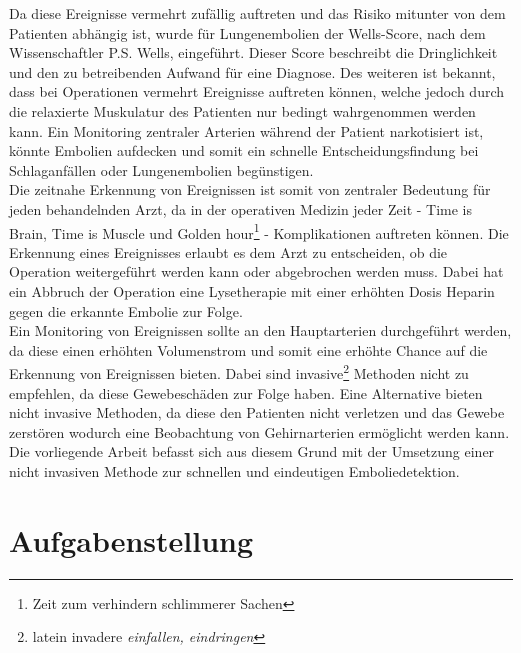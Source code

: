 Da diese Ereignisse vermehrt zufällig auftreten und das Risiko mitunter von dem Patienten abhängig ist, wurde für Lungenembolien der Wells-Score, nach dem Wissenschaftler P.S. Wells, eingeführt. Dieser Score beschreibt die Dringlichkeit und den zu betreibenden Aufwand für eine Diagnose. Des weiteren ist bekannt, dass bei Operationen vermehrt Ereignisse auftreten können, welche jedoch durch die relaxierte Muskulatur des Patienten nur bedingt wahrgenommen werden kann. Ein Monitoring zentraler Arterien während der Patient narkotisiert ist, könnte Embolien aufdecken und somit ein schnelle Entscheidungsfindung bei Schlaganfällen oder Lungenembolien begünstigen.\\
Die zeitnahe Erkennung von Ereignissen ist somit von zentraler Bedeutung für jeden behandelnden Arzt, da in der operativen Medizin jeder Zeit -  \glqq Time is Brain\grqq{}, \glqq Time is Muscle\grqq{} und \glqq Golden hour\footnote{Zeit zum verhindern schlimmerer Sachen}\grqq{} - Komplikationen auftreten können. Die Erkennung eines Ereignisses erlaubt es dem Arzt zu entscheiden, ob die Operation weitergeführt werden kann oder abgebrochen werden muss. Dabei hat ein Abbruch der Operation eine Lysetherapie mit einer erhöhten Dosis Heparin gegen die erkannte Embolie zur Folge.\\
Ein Monitoring von Ereignissen sollte an den Hauptarterien durchgeführt werden, da diese einen erhöhten Volumenstrom und somit eine erhöhte Chance auf die Erkennung von Ereignissen bieten. Dabei sind invasive\footnote{latein invadere \textit{einfallen, eindringen}} Methoden nicht zu empfehlen, da diese Gewebeschäden zur Folge haben. Eine Alternative bieten nicht invasive Methoden, da diese den Patienten nicht verletzen und das Gewebe zerstören wodurch eine Beobachtung von Gehirnarterien ermöglicht werden kann.\\
Die vorliegende Arbeit befasst sich aus diesem Grund mit der Umsetzung einer nicht invasiven Methode zur schnellen und eindeutigen Emboliedetektion.

\section{Aufgabenstellung}
